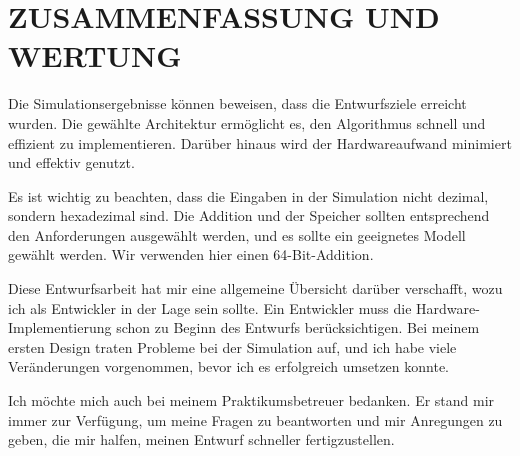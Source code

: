 \chapter{ZUSAMMENFASSUNG UND WERTUNG}
\label{sec:evaluation}

Die Simulationsergebnisse können beweisen, dass die Entwurfsziele erreicht wurden. Die gewählte Architektur ermöglicht es, den Algorithmus schnell und effizient zu implementieren. Darüber hinaus wird der Hardwareaufwand minimiert und effektiv genutzt.

\vspace{\baselineskip}

\noindent Es ist wichtig zu beachten, dass die Eingaben in der Simulation nicht dezimal, sondern hexadezimal sind. Die Addition und der Speicher sollten entsprechend den Anforderungen ausgewählt werden, und es sollte ein geeignetes Modell gewählt werden. Wir verwenden hier einen 64-Bit-Addition.

\vspace{\baselineskip}

\noindent Diese Entwurfsarbeit hat mir eine allgemeine Übersicht darüber verschafft, wozu ich als Entwickler in der Lage sein sollte. Ein Entwickler muss die Hardware-Implementierung schon zu Beginn des Entwurfs berücksichtigen. Bei meinem ersten Design traten Probleme bei der Simulation auf, und ich habe viele Veränderungen vorgenommen, bevor ich es erfolgreich umsetzen konnte.

\vspace{\baselineskip}

\noindent Ich möchte mich auch bei meinem Praktikumsbetreuer bedanken. Er stand mir immer zur Verfügung, um meine Fragen zu beantworten und mir Anregungen zu geben, die mir halfen, meinen Entwurf schneller fertigzustellen.
\cleardoublepage

